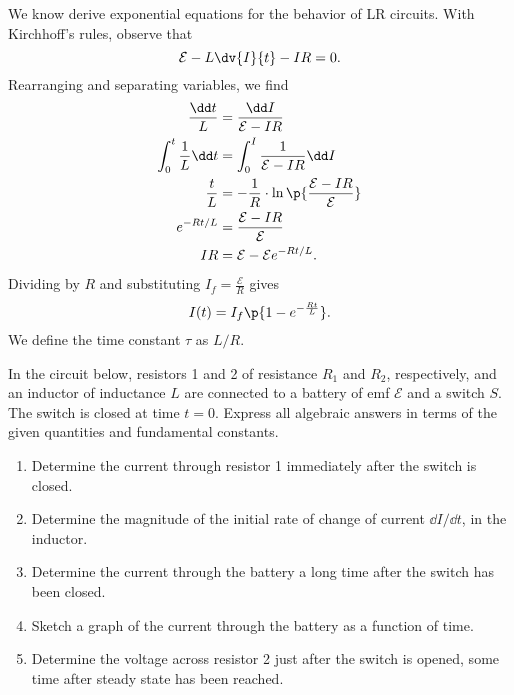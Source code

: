 \documentclass[11pt]{article}
\begin{document}
We know derive exponential equations for the behavior of LR circuits. With Kirchhoff's rules, observe that
\[\mathcal{E} - L\dv{I}{t} - IR = 0.\]
Rearranging and separating variables, we find
\begin{align*}
    \frac{\dd t}{L} &= \frac{\dd I}{\mathcal{E} - IR} \\
    \int_0^t \frac{1}{L} \dd t &= \int_0^I \frac{1}{\mathcal{E} - IR} \dd I \\
    \frac{t}{L} &= -\frac{1}{R} \cdot \ln\p{\frac{\mathcal{E} - IR}{\mathcal{E}}} \\
    e^{-Rt/L} &= \frac{\mathcal{E} - IR}{\mathcal{E}} \\
    IR &= \mathcal{E} - \mathcal{E}e^{-Rt/L}.
\end{align*}
Dividing by $R$ and substituting $I_f = \frac{\mathcal{E}}{R}$ gives
\begin{equation}
    I(t) = I_f\p{1-e^{-\frac{Rt}{L}}}.
\end{equation}
We define the time constant $\tau$ as $L/R$.
\begin{example}[2005 E2]
    In the circuit below, resistors 1 and 2 of resistance $R_1$ and $R_2$, respectively, and an inductor of inductance $L$ are connected to a battery of emf $\mathcal{E}$ and a switch $S$. The switch is closed at time $t = 0$. Express all algebraic answers in terms of the given quantities and fundamental constants.
    \begin{enumerate}[label=(\alph*), noitemsep, topsep=5pt]
        \item Determine the current through resistor 1 immediately after the switch is closed.
        \item Determine the magnitude of the initial rate of change of current $\dd I/\dd t$, in the inductor.
        \item Determine the current through the battery a long time after the switch has been closed.
        \item Sketch a graph of the current through the battery as a function of time.
        \item Determine the voltage across resistor 2 just after the switch is opened, some time after steady state has been reached.
    \end{enumerate}
    \begin{center}
        \centering
    \end{center}
\end{example}
\end{document}
